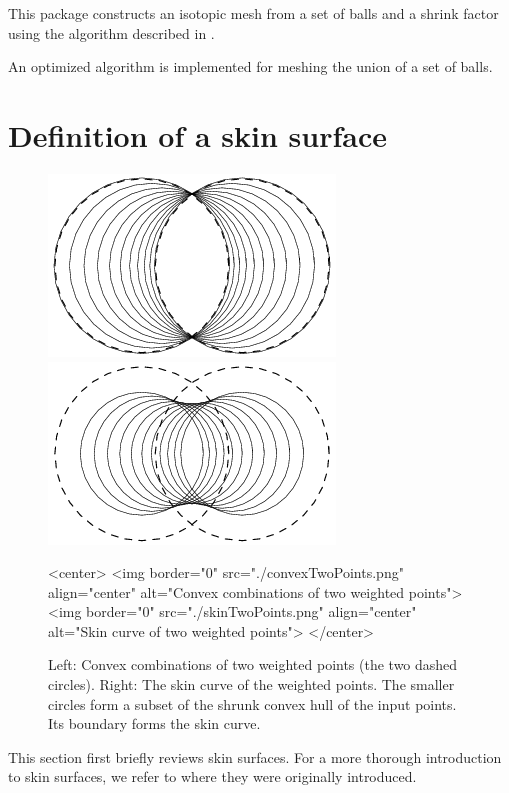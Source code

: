 This package constructs an isotopic mesh from a set of balls and a
shrink factor using the algorithm described in
\cite{cgal:kv-mssct-05}. %

An optimized algorithm is implemented for meshing the union of a set
of balls.

\section{Definition of a skin surface}
\label{sec:skindefinition}

\begin{figure}
  \begin{ccTexOnly}
    \begin{center}
      \includegraphics[width=.25\textwidth]{Skin_surface_3/convexTwoPoints}
      \includegraphics[width=.25\textwidth]{Skin_surface_3/skinTwoPoints}
    \end{center}
  \end{ccTexOnly}
  \begin{ccHtmlOnly}
    <center>
    <img border="0" src="./convexTwoPoints.png" align="center" alt="Convex combinations of two weighted points">
    <img border="0" src="./skinTwoPoints.png" align="center" alt="Skin
    curve of two weighted points">
    </center>
  \end{ccHtmlOnly}
  \caption{\label{fig:twoPoints} Left: Convex combinations of two
    weighted points (the two dashed circles). Right: The skin curve of
    the weighted points. The smaller circles form a subset of the
    shrunk convex hull of the input points. Its boundary forms the
    skin curve. }
\end{figure}

This section first briefly reviews skin surfaces. For a more thorough
introduction to skin surfaces, we refer to \cite{cgal:e-dssd-99} where
they were originally introduced.

